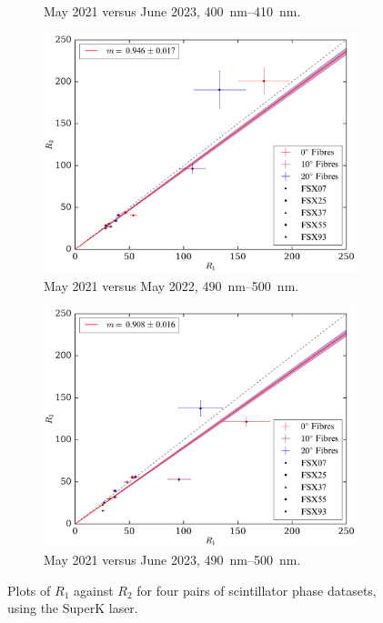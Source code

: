 \begin{figure}
\begin{subfigure}{0.48\textwidth}
        \caption{May 2021 versus June 2023, \SIrange{400}{410}{\nm}.}
        \label{fig:smellie_scat_r1r2_sk405_jun23}
    \end{subfigure}
    \begin{subfigure}{0.48\textwidth}
        \centering
        \includegraphics[width=\textwidth]{5_SMELLIEAnalysis/images/R1_vs_R2_superK_490_500_May2022.pdf}
        \caption{May 2021 versus May 2022, \SIrange{490}{500}{\nm}.}
        \label{fig:smellie_scat_r1r2_sk495_may22}
    \end{subfigure}
    \begin{subfigure}{0.48\textwidth}
        \centering
        \includegraphics[width=\textwidth]{5_SMELLIEAnalysis/images/R1_vs_R2_superK_490_500_Jun2023.pdf}
        \caption{May 2021 versus June 2023, \SIrange{490}{500}{\nm}.}
        \label{fig:smellie_scat_r1r2_sk495_jun23}
    \end{subfigure}
    \caption[Plots of $R_{1}$ against $R_{2}$ for four pairs of scintillator phase datasets, using the SuperK laser]
    {Plots of $R_{1}$ against $R_{2}$ for four pairs of scintillator phase datasets, using the SuperK laser.}
    \label{fig:smellie_scat_r1r2_plots}
\end{figure}

